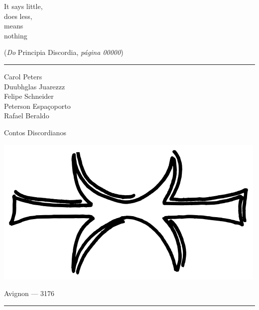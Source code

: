 \thispagestyle{empty}
\begin{center}
\vspace*{\fill}
\begin{flushright}
{\large\foreignlanguage{english}{It says little,\\
does less, \\
means \\
nothing} \\}

{\tiny (\emph{Do} Principia Discordia, \emph{página 00000})}
\end{flushright}
\end{center}
\cleardoublepage

\thispagestyle{empty}

\hrule

\begin{center}
{\scriptsize
Carol Peters\\
Duubhglas Juarezzz\\
Felipe Schneider\\
Peterson Espaçoporto\\
Rafael Beraldo\\
}
\vspace{.5cm}

{\Large Contos Discordianos}

\vspace{2cm}

\includegraphics[scale=.35]{eris_hand}

\vfill

Avignon --- 3176
\vspace{.5em}
\hrule

\end{center}
\newpage

